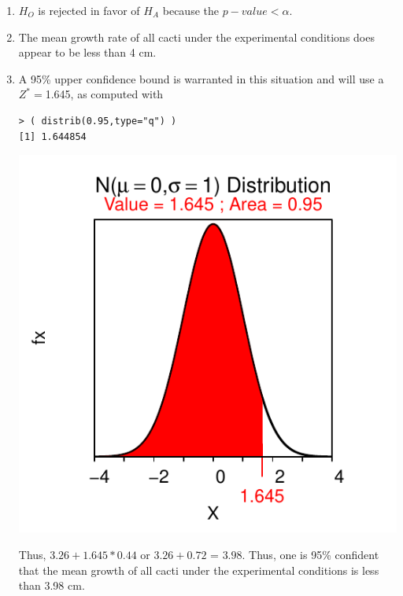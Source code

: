 \documentclass[10pt,openany]{book}\usepackage[]{graphicx}\usepackage[]{color}
\makeatletter
\newenvironment{kframe}{%
 \def\at@end@of@kframe{}%
 \ifinner\ifhmode%
  \def\at@end@of@kframe{\end{minipage}}%
  \begin{minipage}{\columnwidth}%
 \fi\fi%
 \def\FrameCommand##1{\hskip\@totalleftmargin \hskip-\fboxsep
 \colorbox{shadecolor}{##1}\hskip-\fboxsep
     \hskip-\linewidth \hskip-\@totalleftmargin \hskip\columnwidth}%
 \MakeFramed {\advance\hsize-\width
   \@totalleftmargin\z@ \linewidth\hsize
   \@setminipage}}%
 {\par\unskip\endMakeFramed%
 \at@end@of@kframe}
\newenvironment{knitrout}{}{} %
\makeatother
\begin{document}
\begin{itemize}
\begin{enumerate}
\begin{knitrout}
\end{knitrout}
      \item $H_{O}$ is rejected in favor of $H_{A}$ because the $p-value<\alpha$.
      \item The mean growth rate of all cacti under the experimental conditions does appear to be less than 4 cm.
      \item A 95\% upper confidence bound is warranted in this situation and will use a $Z^{*}=$1.645, as computed with
\begin{knitrout}
\color{fgcolor}\begin{kframe}
\begin{verbatim}
> ( distrib(0.95,type="q") )
[1] 1.644854
\end{verbatim}
\end{kframe}

{\centering \includegraphics[width=.4\linewidth]{Figs/unnamed-chunk-347-1} 

}



\end{knitrout}
Thus, $3.26+1.645*0.44$ or $3.26+0.72$ = $3.98$.  Thus, one is 95\% confident that the mean growth of all cacti under the experimental conditions is less than 3.98 cm.
    \end{enumerate}


\end{itemize}
\end{document}
